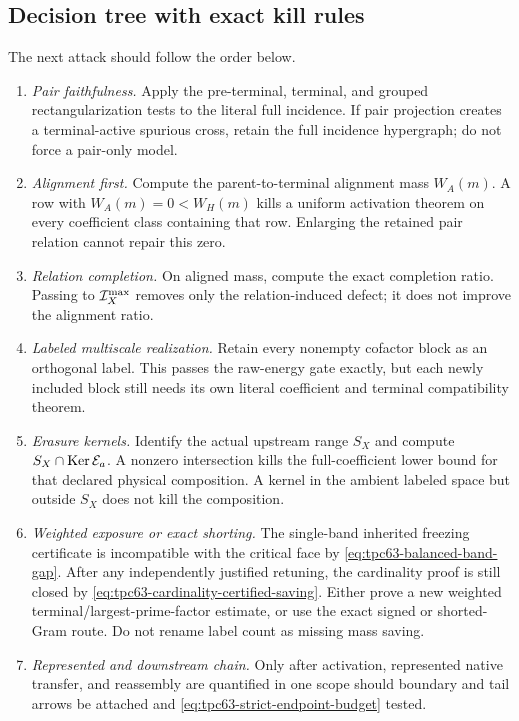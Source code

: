 \subsection{Decision tree with exact kill rules}

The next attack should follow the order below.
\begin{enumerate}[label=\textbf{Gate \arabic*.},leftmargin=4.4em]
 \item \emph{Pair faithfulness.}  Apply the pre-terminal, terminal, and
       grouped rectangularization tests to the literal full incidence.  If
       pair projection creates a terminal-active spurious cross, retain the
       full incidence hypergraph; do not force a pair-only model.
 \item \emph{Alignment first.}  Compute the parent-to-terminal
       alignment mass \(W_A(m)\).  A row with
       \(W_A(m)=0<W_H(m)\) kills a uniform activation theorem on every
       coefficient class containing that row.  Enlarging the retained pair
       relation cannot repair this zero.
 \item \emph{Relation completion.}  On aligned mass, compute the exact
       completion ratio.  Passing to \(\mathcal I_X^{\max}\) removes only the
       relation-induced defect; it does not improve the alignment ratio.
 \item \emph{Labeled multiscale realization.}  Retain every nonempty
       cofactor block as an orthogonal label.  This passes the raw-energy
       gate exactly, but each newly included block still needs its own
       literal coefficient and terminal compatibility theorem.
 \item \emph{Erasure kernels.}  Identify the actual upstream range \(S_X\)
       and compute \(S_X\cap\operatorname{Ker}\mathcal E_a\).  A nonzero intersection kills the
       full-coefficient lower bound for that declared physical
       composition.  A kernel in the ambient labeled space but outside
       \(S_X\) does not kill the composition.
 \item \emph{Weighted exposure or exact shorting.}  The single-band
       inherited freezing certificate is incompatible with the critical
       face by \eqref{eq:tpc63-balanced-band-gap}.  After any independently
       justified retuning, the cardinality proof is still closed by
       \eqref{eq:tpc63-cardinality-certified-saving}.  Either prove a new
       weighted terminal/largest-prime-factor estimate, or use the exact
       signed or shorted-Gram route.  Do not rename label count as missing
       mass saving.
 \item \emph{Represented and downstream chain.}  Only after activation,
       represented native transfer, and reassembly are quantified in one
       scope should boundary and tail arrows be attached and
       \eqref{eq:tpc63-strict-endpoint-budget} tested.
\end{enumerate}

